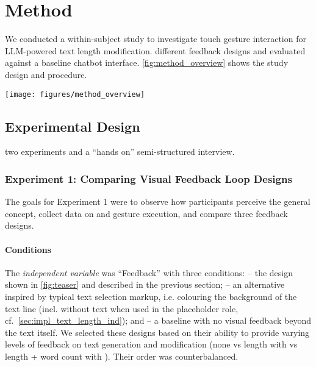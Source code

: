 \section{Method}\label{sec:method}
We conducted a within-subject  study to investigate touch gesture interaction for LLM-powered text length modification.  different feedback designs and evaluated  against a baseline chatbot interface. \cref{fig:method_overview} shows the study design and procedure.


\begin{figure*}
    \centering
    \texttt{[image: figures/method\_overview]}
    \caption{Overview of our user study design and procedure.}
    \label{fig:method_overview}
\end{figure*}


\subsection{Experimental Design}
 two experiments and a ``hands on'' semi-structured interview.

\subsubsection{Experiment 1: Comparing Visual Feedback Loop Designs}
The goals for Experiment 1 were to observe how participants perceive the general concept, collect data on \spread{} and \pinch{} gesture execution, and compare three feedback designs.


\paragraph{Conditions}
The \textit{independent variable} was ``Feedback'' with three conditions: 
\visbubble{} -- the design shown in \cref{fig:teaser} and described in the previous section; 
\visline{} -- an alternative inspired by typical text selection markup, i.e. colouring the background of the text line (incl. without text when used in the placeholder role, cf.~\cref{sec:impl_text_length_ind}); 
and \visnone{} -- a baseline with no visual feedback beyond the text itself.
We selected these designs based on their ability to provide varying levels of feedback on text generation and modification (none vs length with \visline{} vs length + word count with \visbubble).
Their order was counterbalanced.


